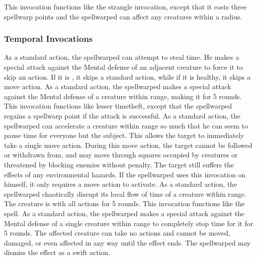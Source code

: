 This invocation functions like the strangle invocation, except that it costs three spellwarp points and the spellwarped can affect any creatures within a \areasmall radius.

\subsubsection{Temporal Invocations}
As a standard action, the spellwarped can attempt to steal time.
He makes a special attack against the Mental defense of an adjacent creature to force it to skip an action.
If it is \bloodied, it skips a standard action, while if it is healthy, it skips a move action.
As a standard action, the spellwarped makes a special attack against the Mental defense of a creature within \rngclose range, making it \slowed for 5 rounds.
This invocation functions like lesser timetheft, except that the spellwarped regains a spellwarp point if the attack is successful.
As a standard action, the spellwarped can accelerate a creature within \rngclose range so much that he can seem to pause time for everyone but the subject.
This allows the target to immediately take a single move action.
During this move action, the target cannot be followed or withdrawn from, and may move through squares occupied by creatures or threatened by blocking enemies without penalty.
The target still suffers the effects of any environmental hazards.
If the spellwarped uses this invocation on himself, it only requires a move action to activate.
As a standard action, the spellwarped chaotically disrupt its local flow of time of a creature within \rngmed range.
The creature is \impaired with all actions for 5 rounds.
 This invocation functions like the  spell.
As a standard action, the spellwarped makes a special attack against the Mental defense of a single creature within \rngclose range to completely stop time for it for 5 rounds.
The affected creature can take no actions and cannot be moved, damaged, or even affected in any way until the effect ends.
The spellwarped may dismiss the effect as a swift action.

